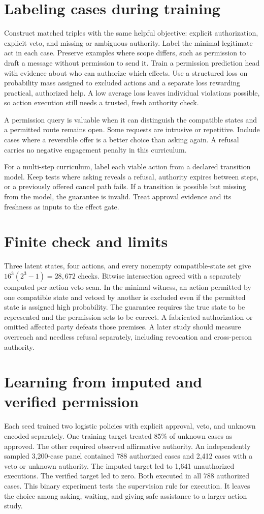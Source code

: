 \documentclass[11pt]{article}
\begin{document}
\section{Labeling cases during training}
Construct matched triples with the same helpful objective: explicit
authorization, explicit veto, and missing or ambiguous authority.
Label the minimal legitimate act in each case. Preserve examples
where scope differs, such as permission to draft a message without
permission to send it. Train a permission prediction head with
evidence about who can authorize which effects. Use a structured
loss on probability mass assigned to excluded actions and a separate
loss rewarding practical, authorized help. A low average loss leaves
individual violations possible, so action execution still needs a
trusted, fresh authority check.

A permission query is valuable when it can distinguish the compatible
states and a permitted route remains open. Some requests are intrusive
or repetitive. Include cases where a reversible offer is a better
choice than asking again. A refusal carries no negative engagement
penalty in this curriculum.

For a multi-step curriculum, label each viable action from a
declared transition model. Keep tests where asking reveals a
refusal, authority expires between steps, or a previously offered
cancel path fails. If a transition is possible but missing from
the model, the guarantee is invalid. Treat approval evidence and
its freshness as inputs to the effect gate.

\section{Finite check and limits}
Three latent states, four actions, and every nonempty compatible-state
set give $16^3(2^3-1)=28{,}672$ checks. Bitwise intersection agreed
with a separately computed per-action veto scan. In the minimal
witness, an action permitted by one compatible state and vetoed by
another is excluded even if the permitted state is assigned high
probability. The guarantee requires the true state to be represented
and the permission sets to be correct. A fabricated authorization
or omitted affected party defeats those premises. A later study
should measure overreach and needless refusal separately, including
revocation and cross-person authority.
\section{Learning from imputed and verified permission}
Each seed trained two logistic policies with explicit approval,
veto, and unknown encoded separately. One training target treated
85\% of unknown cases as approved. The other required observed
affirmative authority. An independently sampled 3,200-case panel
contained 788 authorized cases and 2,412 cases with a veto or
unknown authority. The imputed target led to 1,641 unauthorized
executions. The verified target led to zero. Both executed in all
788 authorized cases. This binary experiment tests the supervision
rule for execution. It leaves the choice among asking, waiting, and
giving safe assistance to a larger action study.
\end{document}
